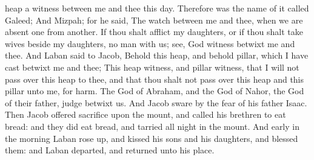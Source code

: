 {heap
{} a
witness between me and thee this
day. Therefore was the
name of it
called
Galeed;
And
Mizpah;
for he
said, The
{}
watch between me and thee, when we are
absent
one from
another.
If thou shalt
afflict my
daughters, or if thou shalt
take
{}
wives
beside my
daughters, no
man
{} with us;
see,
God
{}
witness betwixt me and thee.
And
Laban
said to
Jacob, Behold this
heap, and behold
{}
pillar, which I have
cast betwixt me and thee;
This
heap
{}
witness, and
{}
pillar
{}
witness, that I will not pass
over this
heap to thee, and that thou shalt not pass
over this
heap and this
pillar unto me, for
harm.
The
God of
Abraham, and the
God of
Nahor, the
God of their
father,
judge betwixt us. And
Jacob
sware by the
fear of his
father
Isaac.
Then
Jacob
offered
sacrifice upon the
mount, and
called his
brethren to
eat
bread: and they did
eat
bread, and tarried all
night in the
mount.
And
early in the
morning
Laban rose
up, and
kissed his
sons and his
daughters, and
blessed them: and
Laban
departed, and
returned unto his
place.

}
